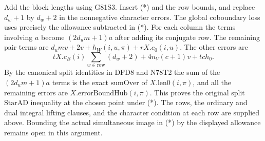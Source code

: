 Add the block lengths using G81S3. Insert (*) and the row bounds,
and replace $d_w+1$ by $d_w+2$ in the nonnegative character
errors. The global coboundary loss uses precisely the allowance
subtracted in (*). For each column the terms involving $a$
become $(2d_um+1)a$ after adding its conjugate row. The remaining
pair terms are $d_um v+2v+h_W(i,u,\pi)+rX.c_0(i,u)$.
The other errors are
\[
    t X.c_B(i)\sum_{w\in\mathrm{row}}(d_w+2)
            +4 n_V(c+1)v+tc h_0 .
\]
By the canonical split identities in DFD8 and N78T2 the sum
of the $(2d_um+1)a$ terms is the exact $\mathrm{sumOver}$ of
$X.\mathrm{len0}(i,\pi)$, and all the remaining errors are
$X.\mathrm{errorBoundHub}(i,\pi)$. This proves the original split
$\mathrm{StarAD}$ inequality at the chosen point under (*).
The rows, the ordinary and dual integral lifting clauses, and
the character condition at each row are supplied above. Bounding
the actual simultaneous image in (*) by the displayed allowance
remains open in this argument.
